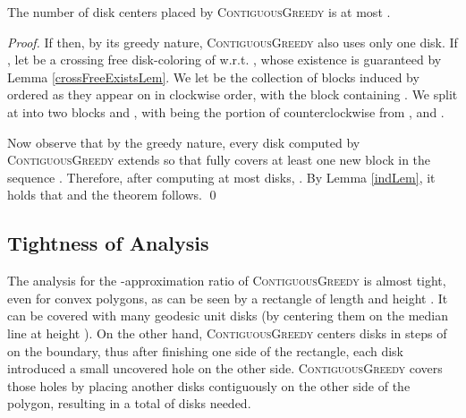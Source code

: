 \documentclass{llncs}
\begin{document}
\begin{theorem}
The number of disk centers placed by \textsc{ContiguousGreedy} is at most .
\end{theorem}
\begin{proof}


If  then, by its greedy nature, \textsc{ContiguousGreedy} also uses only one disk. 
If , let  be a crossing free disk-coloring of  w.r.t. , whose existence is guaranteed by Lemma \ref{crossFreeExistsLem}. We let  be the collection of blocks induced by  ordered as they appear on   in clockwise order, with  the block containing . We split  at  into two blocks  and , with  being the portion of  counterclockwise from , and .

Now observe that by the greedy nature, every disk  computed by \textsc{ContiguousGreedy} extends  so that  fully covers at least one new block in the sequence .  Therefore, after computing at most  disks, . By Lemma \ref{indLem}, it holds that  and the theorem follows.  
\qed
\end{proof}


\subsection{Tightness of Analysis}
The analysis for the -approximation ratio of \textsc{ContiguousGreedy} is almost tight, even for convex polygons, as can be seen by a rectangle of length  and height . It can be covered with  many geodesic unit disks (by centering them on the median line at height ). On the other hand, \textsc{ContiguousGreedy} centers disks in steps of  on the boundary, thus after finishing one side of the rectangle, each disk introduced a small uncovered hole on the other side. \textsc{ContiguousGreedy} covers those holes by placing another  disks contiguously on the other side of the polygon, resulting in a total of  disks needed.\\

\vspace{-30pt}
\end{document}
